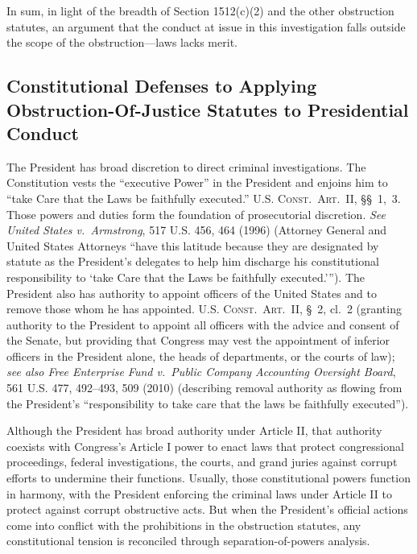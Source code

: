 \hr

In sum, in light of the breadth of Section 1512(c)(2) and the other obstruction statutes, an argument that the conduct at issue in this investigation falls outside the scope of the obstruction---laws lacks merit.

\subsection{Constitutional Defenses to Applying Obstruction-Of-Justice Statutes to Presidential Conduct}

The President has broad discretion to direct criminal investigations.
The Constitution vests the ``executive Power'' in the President and enjoins him to ``take Care that the Laws be faithfully executed.'' \textsc{U.S. Const.\ Art.~II}, \S\S~1,~3.
Those powers and duties form the foundation of prosecutorial discretion.
\textit{See United States v.\ Armstrong}, 517 U.S. 456, 464 (1996) (Attorney General and United States Attorneys ``have this latitude because they are designated by statute as the President's delegates to help him discharge his constitutional responsibility to `take Care that the Laws be faithfully executed.'{}'').
The President also has authority to appoint officers of the United States and to remove those whom he has appointed.
\textsc{U.S. Const.\ Art.~II}, \S~2, cl.~2 (granting authority to the President to appoint all officers with the advice and consent of the Senate, but providing that Congress may vest the appointment of inferior officers in the President alone, the heads of departments, or the courts of law);
\textit{see also Free Enterprise Fund v.\ Public Company Accounting Oversight Board}, 561 U.S. 477, 492--493, 509 (2010) (describing removal authority as flowing from the President's ``responsibility to take care that the laws be faithfully executed'').

Although the President has broad authority under Article II, that authority coexists with Congress's Article I power to enact laws that protect congressional proceedings, federal investigations, the courts, and grand juries against corrupt efforts to undermine their functions.
Usually, those constitutional powers function in harmony, with the President enforcing the criminal laws under Article II to protect against corrupt obstructive acts.
But when the President's official actions come into conflict with the prohibitions in the obstruction statutes, any constitutional tension is reconciled through separation-of-powers analysis.

